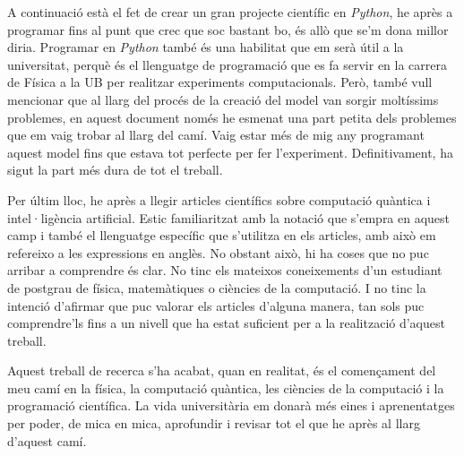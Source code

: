 A continuació està el fet de crear un gran projecte científic en \textit{Python}, he après a programar fins al punt que crec que soc bastant bo, és allò que se'm dona millor diria. Programar en \textit{Python} també és una habilitat que em serà útil a la universitat, perquè és el llenguatge de programació que es fa servir en la carrera de Física a la UB per realitzar experiments computacionals. Però, també vull mencionar que al llarg del procés de la creació del model van sorgir moltíssims problemes, en aquest document només he esmenat una part petita dels problemes que em vaig trobar al llarg del camí. Vaig estar més de mig any programant aquest model fins que estava tot perfecte per fer l'experiment. Definitivament, ha sigut la part més dura de tot el treball.

Per últim lloc, he après a llegir articles científics sobre computació quàntica i intel·ligència artificial. Estic familiaritzat amb la notació que s'empra en aquest camp i també el llenguatge específic que s'utilitza en els articles, amb això em refereixo a les expressions en anglès. No obstant això, hi ha coses que no puc arribar a comprendre és clar. No tinc els mateixos coneixements d'un estudiant de postgrau de física, matemàtiques o ciències de la computació. I no tinc la intenció d'afirmar que puc valorar els articles d'alguna manera, tan sols puc comprendre'ls fins a un nivell que ha estat suficient per a la realització d'aquest treball.

Aquest treball de recerca s'ha acabat, quan en realitat, és el començament del meu camí en la física, la computació quàntica, les ciències de la computació i la programació científica. La vida universitària em donarà més eines i aprenentatges per poder, de mica en mica, aprofundir i revisar tot el que he après al llarg d'aquest camí. 





